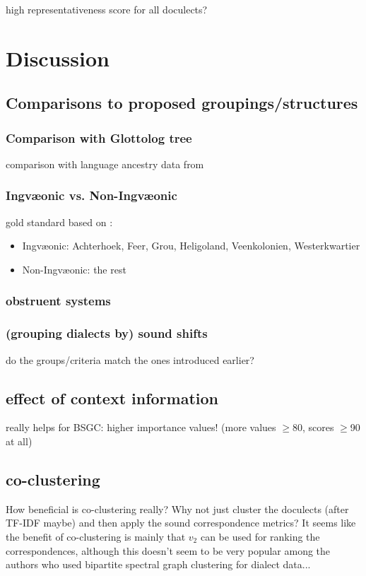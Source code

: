 \documentclass[a4paper]{article}
\begin{document}

high representativeness score for all doculects?


\newpage
\section{Discussion}


\subsection{Comparisons to proposed groupings/structures}
\subsubsection{Comparison with Glottolog tree}
comparison with language ancestry data from \citet{hammarstrom2018glottolog}

\subsubsection{Ingv\ae{}onic vs. Non-Ingv\ae{}onic}
gold standard based on \citet{stiles2013pan-west}:
\begin{itemize}
\item
Ingv\ae{}onic:
Achterhoek, Feer, Grou, Heligoland, Veenkolonien, Westerkwartier
\item
Non-Ingv\ae{}onic:
the rest
\end{itemize}

\subsubsection{obstruent systems}

\subsubsection{(grouping dialects by) sound shifts}

do the groups/criteria match the ones introduced earlier?

\subsection{effect of context information}

really helps for BSGC: higher importance values! (more values $\geq$80, scores $\geq$90 at all)

\subsection{co-clustering}
How beneficial is co-clustering really? Why not just cluster the doculects (after TF-IDF maybe) and then apply the sound correspondence metrics? It seems like the benefit of co-clustering is mainly that $v_2$ can be used for ranking the correspondences, although this doesn't seem to be very popular among the authors who used bipartite spectral graph clustering for dialect data...
\end{document}
